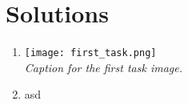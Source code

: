 \documentclass{article}
\begin{document}

\section*{Solutions}
\begin{enumerate}
        \item \makebox[0pt][l]{} %
        \centering
        \texttt{[image: first\_task.png]} \\
        \textit{Caption for the first task image.} %
    
        \item asd
\end{enumerate}
\end{document}

